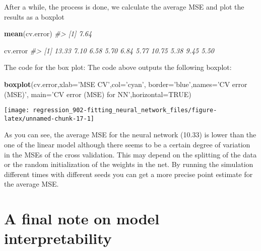 \documentclass[]{book}
\newenvironment{Shaded}{\begin{snugshade}}{\end{snugshade}}
\newcommand{\CommentTok}[1]{\textcolor[rgb]{0.56,0.35,0.01}{\textit{#1}}}
\newcommand{\DataTypeTok}[1]{\textcolor[rgb]{0.13,0.29,0.53}{#1}}
\newcommand{\KeywordTok}[1]{\textcolor[rgb]{0.13,0.29,0.53}{\textbf{#1}}}
\newcommand{\NormalTok}[1]{#1}
\newcommand{\OtherTok}[1]{\textcolor[rgb]{0.56,0.35,0.01}{#1}}
\newcommand{\StringTok}[1]{\textcolor[rgb]{0.31,0.60,0.02}{#1}}
\begin{document}
After a while, the process is done, we calculate the average MSE and plot the results as a boxplot

\begin{Shaded}
\begin{Highlighting}[]
\KeywordTok{mean}\NormalTok{(cv.error)}
\CommentTok{#> [1] 7.64}
\end{Highlighting}
\end{Shaded}

\begin{Shaded}
\begin{Highlighting}[]
\NormalTok{cv.error}
\CommentTok{#>  [1] 13.33  7.10  6.58  5.70  6.84  5.77 10.75  5.38  9.45  5.50}
\end{Highlighting}
\end{Shaded}

The code for the box plot:
The code above outputs the following boxplot:

\begin{Shaded}
\begin{Highlighting}[]
\KeywordTok{boxplot}\NormalTok{(cv.error,}\DataTypeTok{xlab=}\StringTok{'MSE CV'}\NormalTok{,}\DataTypeTok{col=}\StringTok{'cyan'}\NormalTok{,}
        \DataTypeTok{border=}\StringTok{'blue'}\NormalTok{,}\DataTypeTok{names=}\StringTok{'CV error (MSE)'}\NormalTok{,}
        \DataTypeTok{main=}\StringTok{'CV error (MSE) for NN'}\NormalTok{,}\DataTypeTok{horizontal=}\OtherTok{TRUE}\NormalTok{)}
\end{Highlighting}
\end{Shaded}

\begin{center}\texttt{[image: regression\_902-fitting\_neural\_network\_files/figure-latex/unnamed-chunk-17-1]} \end{center}

As you can see, the average MSE for the neural network (10.33) is lower than the one of the linear model although there seems to be a certain degree of variation in the MSEs of the cross validation. This may depend on the splitting of the data or the random initialization of the weights in the net. By running the simulation different times with different seeds you can get a more precise point estimate for the average MSE.

\hypertarget{a-final-note-on-model-interpretability}{%
\section{A final note on model interpretability}\label{a-final-note-on-model-interpretability}}
\end{document}
